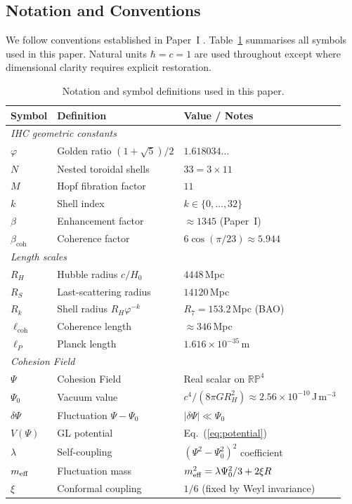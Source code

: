 \subsection{Notation and Conventions}

We follow conventions established in Paper~I \citep{Peacock2026a}.
Table~\ref{tab:notation} summarises all symbols used in this paper.
Natural units $\hbar = c = 1$ are used throughout except where dimensional
clarity requires explicit restoration.

\begin{table}[htbp]
\centering
\caption{Notation and symbol definitions used in this paper.}
\label{tab:notation}
\setlength{\tabcolsep}{6pt}
\renewcommand{\arraystretch}{1.15}
\begin{tabular}{@{}l l l@{}}
\toprule
\textbf{Symbol} & \textbf{Definition} & \textbf{Value / Notes} \\
\midrule
\multicolumn{3}{l}{\textit{IHC geometric constants}} \\
$\varphi$ & Golden ratio $(1+\sqrt{5})/2$ & $1.618034\ldots$ \\
$N$       & Nested toroidal shells & $33 = 3 \times 11$ \\
$M$       & Hopf fibration factor & $11$ \\
$k$       & Shell index & $k \in \{0,\ldots,32\}$ \\
$\beta$   & Enhancement factor & $\approx 1345$ (Paper~I) \\
$\beta_{\mathrm{coh}}$ & Coherence factor & $6\cos(\pi/23)\approx5.944$ \\
\midrule
\multicolumn{3}{l}{\textit{Length scales}} \\
$R_H$     & Hubble radius $c/H_0$ & $4448$\,Mpc \\
$R_S$     & Last-scattering radius & $14120$\,Mpc \\
$R_k$     & Shell radius $R_H\varphi^{-k}$ & $R_7=153.2$\,Mpc (BAO) \\
$\ell_{\mathrm{coh}}$ & Coherence length & $\approx346$\,Mpc \\
$\ell_P$  & Planck length & $1.616\times10^{-35}$\,m \\
\midrule
\multicolumn{3}{l}{\textit{Cohesion Field}} \\
$\Psi$    & Cohesion Field & Real scalar on $\mathbb{RP}^4$ \\
$\Psi_0$  & Vacuum value & $c^4/(8\pi GR_H^2)\approx2.56\!\times\!10^{-10}$\,J\,m$^{-3}$ \\
$\delta\Psi$ & Fluctuation $\Psi-\Psi_0$ & $|\delta\Psi|\ll\Psi_0$ \\
$V(\Psi)$ & GL potential & Eq.~(\ref{eq:potential}) \\
$\lambda$ & Self-coupling & $({\Psi^2-\Psi_0^2})^2$ coefficient \\
$m_{\rm eff}$ & Fluctuation mass & $m_{\rm eff}^2=\lambda\Psi_0^2/3+2\xi R$ \\
$\xi$     & Conformal coupling & $1/6$ (fixed by Weyl invariance) \\
\bottomrule
\end{tabular}
\end{table}

